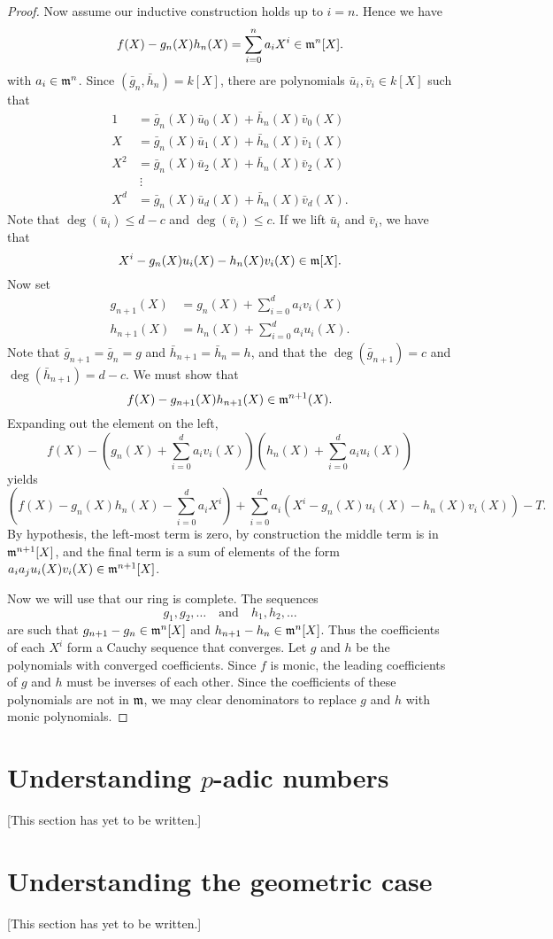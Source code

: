 \documentclass{ximera}
\begin{document}
\begin{theorem}
\begin{proof}
    Now assume our inductive construction holds up to $i=n$. Hence we have
    \[
    f(X) - g_n(X) h_n(X) = \sum_{i=0}^n a_i X^i\in \mathfrak{m}^n[X].
    \]
    with $a_i\in \mathfrak{m}^n$.  Since $(\bar{g}_n, \bar{h}_n) = k[X]$, there
    are polynomials $\bar{u}_i,\bar{v}_i\in k[X]$ such that
    \begin{align*}
      1  &= \bar{g}_n(X)\bar{u}_0(X) + \bar{h}_n(X)\bar{v}_0(X) \\
      X  &= \bar{g}_n(X)\bar{u}_1(X) + \bar{h}_n(X)\bar{v}_1(X) \\
      X^2  &= \bar{g}_n(X)\bar{u}_2(X) + \bar{h}_n(X)\bar{v}_2(X) \\
      &\ \vdots\\
      X^d  &= \bar{g}_n(X)\bar{u}_d(X) + \bar{h}_n(X)\bar{v}_d(X).
    \end{align*}
    Note that $\deg(\bar{u}_i) \le d-c$ and $\deg(\bar{v}_i) \le
    c$. If we lift $\bar{u}_i$ and $\bar{v}_i$, we have that
    \[
    X^i - g_n(X) u_i(X) - h_n(X) v_i(X) \in \mathfrak{m}[X]. 
    \]
    Now set
    \begin{align*}
      g_{n+1}(X) &= g_n(X) + \sum_{i=0}^d a_i v_i(X)\\
      h_{n+1}(X) &= h_n(X) + \sum_{i=0}^d a_i u_i(X).
    \end{align*}
    Note that $\bar{g}_{n+1} = \bar{g}_n = g$ and $\bar{h}_{n+1} =
    \bar{h}_n = h$, and that the $\deg(\bar{g}_{n+1}) = c$ and
    $\deg(\bar{h}_{n+1}) = d-c$. We must show that
    \[
    f(X) - g_{n+1}(X) h_{n+1}(X) \in \mathfrak{m}^{n+1}(X).
    \]
    Expanding out the element on the left,
    \[
    f(X) - \left(g_n(X) + \sum_{i=0}^d a_i v_i(X)\right)\left(h_n(X) + \sum_{i=0}^d a_i u_i(X)\right)
    \]
    yields
    \[
    \left(f(X) - g_n(X)h_n(X) - \sum_{i=0}^d a_i X^i\right) + \sum_{i=0}^d a_i(X^i - g_n(X) u_i(X) - h_n(X) v_i(X)) - T.
    \]
    By hypothesis, the left-most term is zero, by construction the
    middle term is in $\mathfrak{m}^{n+1}[X]$, and the final term is a sum of
    elements of the form $a_ia_ju_i(X)v_i(X)\in\mathfrak{m}^{n+1}[X]$.

    Now we will use that our ring is complete. The sequences
    \[
    g_1,g_2,\dots \quad\text{and}\quad h_1,h_2,\dots
    \]
    are such that $g_{n+1}-g_n\in \mathfrak{m}^n[X]$ and $h_{n+1}-h_n\in
    \mathfrak{m}^n[X]$. Thus the coefficients of each $X^i$ form a Cauchy
    sequence that converges. Let $g$ and $h$ be the polynomials with
    converged coefficients. Since $f$ is monic, the leading
    coefficients of $g$ and $h$ must be inverses of each other. Since
    the coefficients of these polynomials are not in $\mathfrak{m}$, we may
    clear denominators to replace $g$ and $h$ with monic polynomials.
  \end{proof}
\end{theorem}


\section{Understanding $p$-adic numbers}

[This section has yet to be written.]

\section{Understanding the geometric case}

[This section has yet to be written.]
\end{document}
